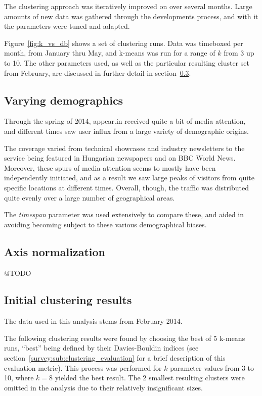 The clustering approach was iteratively improved on over several months. Large amounts of new data was gathered through the developments process, and with it the parameters were tuned and adapted.

Figure~\ref{fig:k_vs_db} shows a set of clustering runs. Data was timeboxed per month, from January thru May, and k-means was run for a range of $k$ from 3 up to 10. The other parameters used, as well as the particular resulting cluster set from February, are discussed in further detail in section~\ref{eval:sec:clustering_results}.

\subsection{Varying demographics}
\label{eval:sub:varying_demographics}

Through the spring of 2014, appear.in received quite a bit of media attention, and different times saw user influx from a large variety of demographic origins.

The coverage varied from technical showcases and industry newsletters to the service being featured in Hungarian newspapers and on BBC World News. Moreover, these spurs of media attention seems to mostly have been independently initiated, and as a result we saw large peaks of visitors from quite specific locations at different times. Overall, though, the traffic was distributed quite evenly over a large number of geographical areas.

The \emph{timespan} parameter was used extensively to compare these, and aided in avoiding becoming subject to these various demographical biases.

\subsection{Axis normalization}
\label{eval:sub:axis_normalization}

@TODO

\subsection{Initial clustering results}
\label{eval:sec:clustering_results}

The data used in this analysis stems from February 2014.

The following clustering results were found by choosing the best of 5 k-means runs, ``best'' being defined by their Davies-Bouldin indices (see section~\ref{survey:sub:clustering_evaluation} for a brief description of this evaluation metric). This process was performed for $k$ parameter values from 3 to 10, where $k = 8$ yielded the best result. The 2 smallest resulting clusters were omitted in the analysis due to their relatively insignificant sizes.

